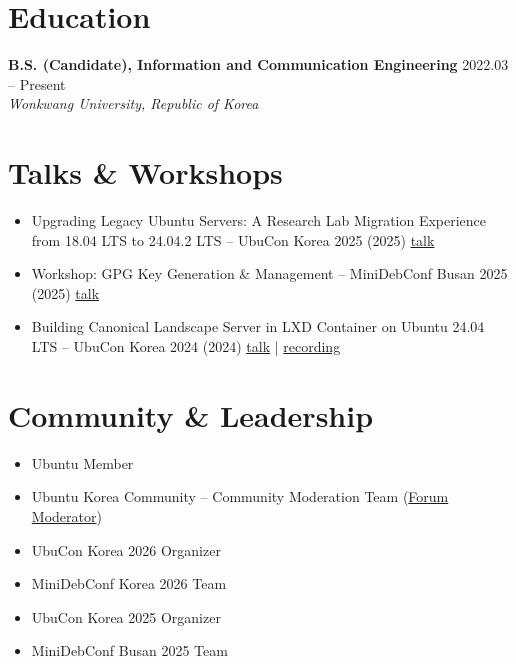 \documentclass[11pt,a4paper]{article}
\begin{document}
\section*{Education}
\textbf{B.S. (Candidate), Information and Communication Engineering} \hfill \small 2022.03 -- Present\\
\textit{Wonkwang University, Republic of Korea}

\section*{Talks \& Workshops}
\begin{itemize}
  \item Upgrading Legacy Ubuntu Servers: A Research Lab Migration Experience from 18.04 LTS to 24.04.2 LTS -- UbuCon Korea 2025 (2025) \href{https://events.canonical.com/event/126/contributions/698/}{talk}
  \item Workshop: GPG Key Generation \& Management -- MiniDebConf Busan 2025 (2025) \href{https://busan2025.mini.debconf.org/talks/14-gpg/}{talk}
  \item Building Canonical Landscape Server in LXD Container on Ubuntu 24.04 LTS -- UbuCon Korea 2024 (2024) \href{https://events.canonical.com/event/48/contributions/441/}{talk} | \href{https://youtu.be/dd27ED2AW60}{recording}
\end{itemize}

\section*{Community \& Leadership}
\begin{itemize}
  \item Ubuntu Member
  \item Ubuntu Korea Community -- Community Moderation Team (\href{https://disclosures.ubuntu-kr.org/organizers/gen7/}{Forum Moderator})
  \item UbuCon Korea 2026 Organizer
  \item MiniDebConf Korea 2026 Team
  \item UbuCon Korea 2025 Organizer
  \item MiniDebConf Busan 2025 Team
\end{itemize}
\end{document}
